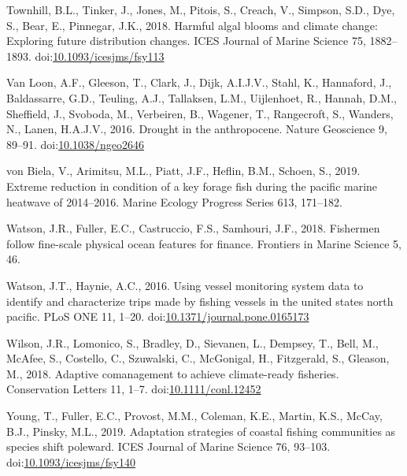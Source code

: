 \documentclass[]{elsarticle} %
\begin{document}
\leavevmode\hypertarget{ref-Townhill2018}{}%
Townhill, B.L., Tinker, J., Jones, M., Pitois, S., Creach, V., Simpson,
S.D., Dye, S., Bear, E., Pinnegar, J.K., 2018. Harmful algal blooms and
climate change: Exploring future distribution changes. ICES Journal of
Marine Science 75, 1882--1893.
doi:\href{https://doi.org/10.1093/icesjms/fsy113}{10.1093/icesjms/fsy113}

\leavevmode\hypertarget{ref-VanLoon2016}{}%
Van Loon, A.F., Gleeson, T., Clark, J., Dijk, A.I.J.V., Stahl, K.,
Hannaford, J., Baldassarre, G.D., Teuling, A.J., Tallaksen, L.M.,
Uijlenhoet, R., Hannah, D.M., Sheffield, J., Svoboda, M., Verbeiren, B.,
Wagener, T., Rangecroft, S., Wanders, N., Lanen, H.A.J.V., 2016. Drought
in the anthropocene. Nature Geoscience 9, 89--91.
doi:\href{https://doi.org/10.1038/ngeo2646}{10.1038/ngeo2646}

\leavevmode\hypertarget{ref-VonBiela2019}{}%
von Biela, V., Arimitsu, M.L., Piatt, J.F., Heflin, B.M., Schoen, S.,
2019. Extreme reduction in condition of a key forage fish during the
pacific marine heatwave of 2014--2016. Marine Ecology Progress Series
613, 171--182.

\leavevmode\hypertarget{ref-Watson2018}{}%
Watson, J.R., Fuller, E.C., Castruccio, F.S., Samhouri, J.F., 2018.
Fishermen follow fine-scale physical ocean features for finance.
Frontiers in Marine Science 5, 46.

\leavevmode\hypertarget{ref-Watson2016}{}%
Watson, J.T., Haynie, A.C., 2016. Using vessel monitoring system data to
identify and characterize trips made by fishing vessels in the united
states north pacific. PLoS ONE 11, 1--20.
doi:\href{https://doi.org/10.1371/journal.pone.0165173}{10.1371/journal.pone.0165173}

\leavevmode\hypertarget{ref-Wilson2018}{}%
Wilson, J.R., Lomonico, S., Bradley, D., Sievanen, L., Dempsey, T.,
Bell, M., McAfee, S., Costello, C., Szuwalski, C., McGonigal, H.,
Fitzgerald, S., Gleason, M., 2018. Adaptive comanagement to achieve
climate-ready fisheries. Conservation Letters 11, 1--7.
doi:\href{https://doi.org/10.1111/conl.12452}{10.1111/conl.12452}

\leavevmode\hypertarget{ref-Young2019}{}%
Young, T., Fuller, E.C., Provost, M.M., Coleman, K.E., Martin, K.S.,
McCay, B.J., Pinsky, M.L., 2019. Adaptation strategies of coastal
fishing communities as species shift poleward. ICES Journal of Marine
Science 76, 93--103.
doi:\href{https://doi.org/10.1093/icesjms/fsy140}{10.1093/icesjms/fsy140}
\end{document}

